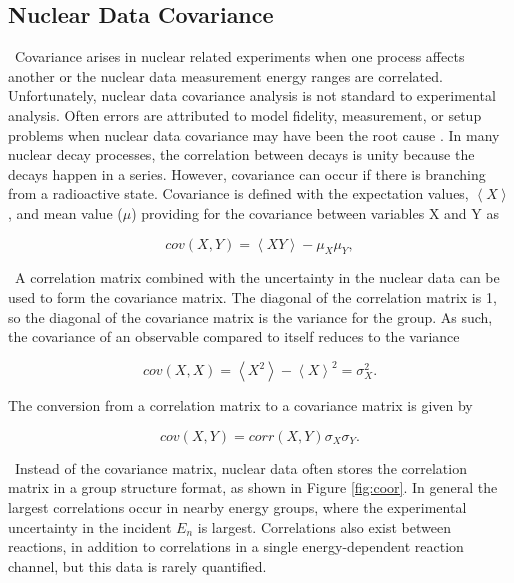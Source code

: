 \subsection{Nuclear Data Covariance}

\ Covariance arises in nuclear related experiments when one process affects another or the nuclear data measurement energy ranges are correlated. 
Unfortunately, nuclear data covariance analysis is not standard to experimental analysis. Often errors are attributed to model fidelity, measurement, or setup problems when nuclear data covariance may have been the root cause \cite{edsdoj111}. 
In many nuclear decay processes, the correlation between decays is unity because the decays happen in a series. 
However, covariance can occur if there is branching from a radioactive state. 
Covariance is defined with the expectation values, $\left\langle X \right\rangle$, and mean value ($\mu$) providing for the covariance between variables X and Y as
 
\begin{equation} \label{eq:Cov1}
      cov(X,Y) = \left\langle  XY \right\rangle-\mu_{X}\mu_{Y}, 
\end{equation}

\ A correlation matrix combined with the uncertainty in the nuclear data can be used to form the covariance matrix. 
The diagonal of the correlation matrix is 1, so the diagonal of the covariance matrix is the variance for the group.  As such, the covariance of an observable compared to itself reduces to the variance 

\begin{equation} \label{eq:Cov2}
      cov(X,X) = \left\langle  X^{2} \right\rangle-\left\langle  X \right\rangle^{2} = \sigma_{X}^{2}.
\end{equation}

\noindent The conversion from a correlation matrix to a covariance matrix is given by

\begin{equation} \label{eq:Cov3}
cov(X,Y) = corr(X,Y) \sigma_{X} \sigma_{Y}. 
\end{equation}

\ Instead of the covariance matrix, nuclear data often stores the correlation matrix in a group structure format, as shown in Figure \ref{fig:coor}. In general the largest correlations occur in nearby energy groups, where the experimental uncertainty in the incident $E_{n}$ is largest. Correlations also exist between reactions, in addition to correlations in a single energy-dependent reaction channel, but this data is rarely quantified.

